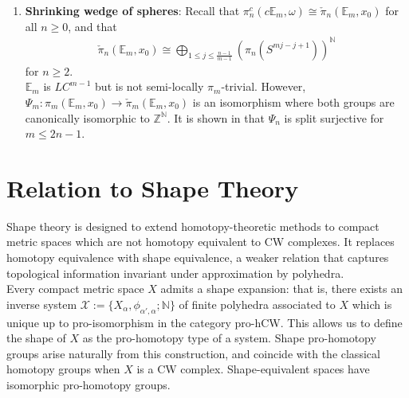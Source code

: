 \documentclass[a4paper,11pt]{article}
\theoremstyle{definition}
\theoremstyle{plain}
\theoremstyle{remark}
\begin{document}
{\begin{enumerate}
In this example, $\Psi_{n}:\pi_{n}(\mathbb{G},x_0) \rightarrow \check{\pi}_{n}(\mathbb{G},x_0)$ makes every homotopy class trivial, ie. \textit{no} class can be detectable by polyhedra. We consider now the coarse homotopy groups of $c\mathbb{G}$. Intuitively speaking, the reason that there are any non-trivial homotopy classes in $\pi_{1}(\mathbb{G},x_0)$ at all, despite its being the wedge sum of two contractible spaces, lies in the fact that there are two cone points, and so if the path is complicated enough, the obvious null-homotopy takes too long to fit into an interval. This, however, is not a problem when looking at its image in the coarse homotopy groups under $\mathfrak{c}$, because the infinite height direction gives us the space we need.  \\

\item  \textbf{Shrinking wedge of spheres}: Recall that $ \pi_{n}^{c}(c\mathbb{E}_{m},\omega)\cong \check{\pi}_n(\mathbb{E}_{m},x_0)$ for all $n\geq 0$, and that 
\begin{align*}
\check{\pi}_n(\mathbb{E}_{m},x_0) \cong \bigoplus_{1\leq j\leq \frac{n-1}{m-1}} (\pi_{n}(S^{mj-j+1}))^{\mathbb{N}}
\end{align*} 
for $n \geq 2$. \\

$\mathbb{E}_{m}$ is $LC^{m-1}$ but is not semi-locally $\pi_{m}$-trivial. However, $\Psi_{m}: \pi_{m}(\mathbb{E}_{m},x_0)\rightarrow \check{\pi}_{m}(\mathbb{E}_{m},x_0)$ is an isomorphism where both groups are canonically isomorphic to $\mathbb{Z}^{\mathbb{N}}$. It is shown in  \cite{brazas2025v} that $\Psi_{n}$ is split surjective for $m\leq 2n-1$. 
\end{enumerate}

\newpage
\part{Relation to Shape Theory}

Shape theory is designed to extend homotopy-theoretic methods to compact metric spaces which are not homotopy equivalent to CW complexes. It replaces homotopy equivalence with shape equivalence, a weaker relation that captures topological information invariant under approximation by polyhedra. \\

Every compact metric space $X$ admits a shape expansion: that is, there exists an inverse system $\mathcal{X}:=\{X_{\alpha},\phi_{\alpha',\alpha}; \mathbb{N}\}$ of finite polyhedra associated to $X$ which is unique up to pro-isomorphism in the category pro-hCW. This allows us to define the shape of $X$ as the pro-homotopy type of a system. Shape pro-homotopy groups arise naturally from this construction, and coincide with the classical homotopy groups when $X$ is a CW complex. Shape-equivalent spaces have isomorphic pro-homotopy groups.\\

}
\end{document}
